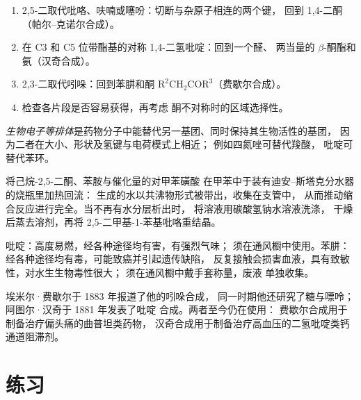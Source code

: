 \begin{method}[杂环的逆合成切断]\label{met:b3:heterocycles:disconnect}
\begin{enumerate}
  \item 2,5-二取代吡咯、呋喃或噻吩：切断与杂原子相连的两个键，
        回到 1,4-二酮（帕尔–克诺尔合成）。
  \item 在 C3 和 C5 位带酯基的对称 1,4-二氢吡啶：回到一个醛、
        两当量的 $\beta$-酮酯和氨（汉奇合成）。
  \item 2,3-二取代吲哚：回到苯肼和酮
        $\mathrm{R^2CH_2COR^3}$（费歇尔合成）。
  \item 检查各片段是否容易获得，再考虑
        酮不对称时的区域选择性。
\end{enumerate}
\end{method}

\begin{definition}[生物电子等排体]\label{def:b3:heterocycles:bioisostere}
\emph{生物电子等排体}是药物分子中能替代另一基团、同时保持其生物活性的基团，
因为二者在大小、形状及氢键与电荷模式上相近；
例如四氮唑可替代羧酸，
吡啶可替代苯环。
\end{definition}

\begin{inthelab}[帕尔–克诺尔法制备吡咯]
将己烷-2,5-二酮、苯胺与催化量的对甲苯磺酸
在甲苯中于装有迪安–斯塔克分水器的烧瓶里加热回流：
生成的水以共沸物形式被带出，收集在支管中，
从而推动缩合反应进行完全。当不再有水分层析出时，
将溶液用碳酸氢钠水溶液洗涤，
干燥后蒸去溶剂，再将 2,5-二甲基-1-苯基吡咯重结晶。
\end{inthelab}

\begin{safety}{}
吡啶：高度易燃，经各种途径均有害，有强烈气味；
须在通风橱中使用。苯肼：经各种途径均有毒，可能致癌并引起遗传缺陷，
反复接触会损害血液，具有致敏性，对水生生物毒性很大；
须在通风橱中戴手套称量，废液
单独收集。
\end{safety}

\begin{history}[两种经典的成环合成]
埃米尔·费歇尔于 1883 年报道了他的吲哚合成，
同一时期他还研究了糖与嘌呤；阿图尔·汉奇于 1881 年发表了吡啶
合成。两者至今仍在使用：
费歇尔合成用于制备治疗偏头痛的曲普坦类药物，
汉奇合成用于制备治疗高血压的二氢吡啶类钙通道阻滞剂。
\end{history}

\section{练习}

